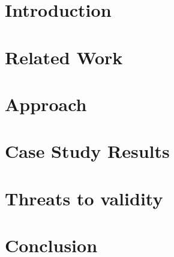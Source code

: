 \documentclass[conference]{IEEEtran}
\begin{document}
\IEEEpeerreviewmaketitle

\section{Introduction}
\label{sec:introduction}


\section{Related Work}
\label{sec:related_work}


\section{Approach}
\label{sec:approach}


\section{Case Study Results}
\label{sec:results}


\section{Threats to validity}
\label{sec:threats_to_validity}


%

\section{Conclusion}
\label{sec:conclusion}




\end{document}
